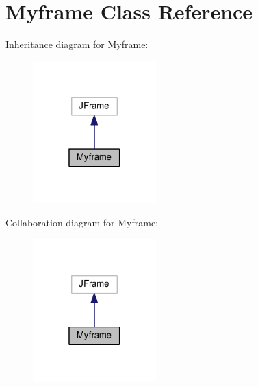 \hypertarget{classMyframe}{\section{Myframe Class Reference}
\label{classMyframe}
}


Inheritance diagram for Myframe\+:
\nopagebreak
\begin{figure}[H]
\begin{center}
\leavevmode
\includegraphics[width=135pt]{classMyframe__inherit__graph}
\end{center}
\end{figure}


Collaboration diagram for Myframe\+:
\nopagebreak
\begin{figure}[H]
\begin{center}
\leavevmode
\includegraphics[width=135pt]{classMyframe__coll__graph}
\end{center}
\end{figure}
